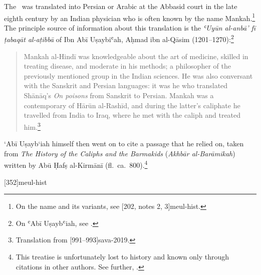 The \SS\ was translated into Persian or Arabic at the Abbasid court in
the late eighth century by an Indian physician who is often known by
the name Mankah.\footnote{On the name and its variants, see
    [202, notes 2, 3]{meul-hist}.}  The principle source of
    information about this translation is the 
    \emph{ʿUyūn al-anbā' fī ṭabaqāt al-aṭibbā} of Ibn Abī Uṣaybiʿah, Aḥmad ibn 
    al-Qāsim
    (1201--1270):\footnote{On ʿAbī Uṣaybʿiah, see \cite{hill-2019}.}
\begin{quote}
    Mankah al-Hindī  was knowledgeable about the art of medicine,
skilled in treating disease, and moderate in his methods; a
philosopher of the previously mentioned group in the Indian
sciences. He was also conversant with the Sanskrit and Persian
languages: it was he who translated Shānāq’s \emph{On poisons}
from Sanskrit to Persian. Mankah was a contemporary of Hārūn
al-Rashīd, and during the latter’s caliphate he travelled from
India to Iraq, where he met with the caliph and treated
him.\footnote{Translation from
    [991--993]{sava-2019}.}
\end{quote}
`Abī Uṣayb`iah himself then went on to cite a passage that he relied on, taken 
from  
\emph{The History of the Caliphs and the Barmakids}  (\emph{Akhbār 
al-Barāmikah}) written by  Abū Ḥafṣ 
al-Kirmānī (fl.\ ca.\ 800).\footnote{This treatise is unfortunately lost to history and 
known only 
through citations in other authors.   See further, \cite{bosw-1994,blad-2011}.}


[352]{meul-hist}
\cite{lang-2018}

